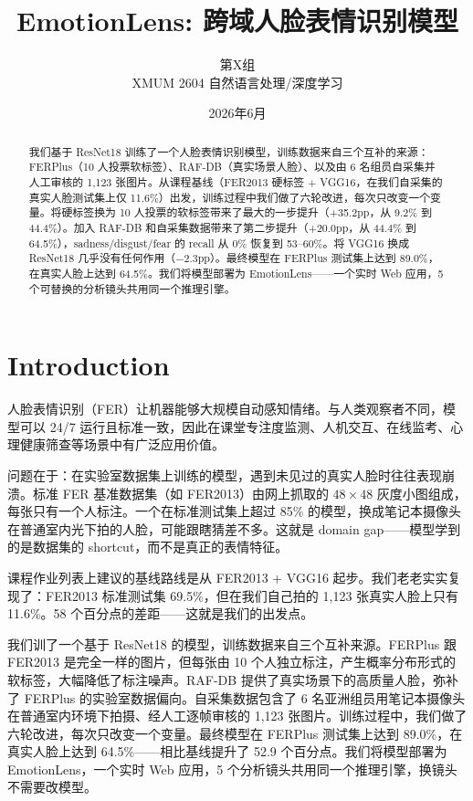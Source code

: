 \documentclass[12pt,a4paper]{ctexart}
\title{\textbf{EmotionLens: 跨域人脸表情识别模型}}
\author{第X组 \\ XMUM 2604 自然语言处理/深度学习}
\date{2026年6月}
\begin{document}
\maketitle

\begin{abstract}
我们基于 ResNet18 训练了一个人脸表情识别模型，训练数据来自三个互补的来源：FERPlus（10 人投票软标签）、RAF-DB（真实场景人脸）、以及由 6 名组员自采集并人工审核的 1,123 张图片。从课程基线（FER2013 硬标签 + VGG16，在我们自采集的真实人脸测试集上仅 11.6\%）出发，训练过程中我们做了六轮改进，每次只改变一个变量。将硬标签换为 10 人投票的软标签带来了最大的一步提升（+35.2pp，从 9.2\% 到 44.4\%）。加入 RAF-DB 和自采集数据带来了第二步提升（+20.0pp，从 44.4\% 到 64.5\%），sadness/disgust/fear 的 recall 从 0\% 恢复到 53--60\%。将 VGG16 换成 ResNet18 几乎没有任何作用（$-$2.3pp）。最终模型在 FERPlus 测试集上达到 89.0\%，在真实人脸上达到 64.5\%。我们将模型部署为 EmotionLens——一个实时 Web 应用，5 个可替换的分析镜头共用同一个推理引擎。
\end{abstract}

\tableofcontents
\newpage

\section{Introduction}

人脸表情识别（FER）让机器能够大规模自动感知情绪。与人类观察者不同，模型可以 24/7 运行且标准一致，因此在课堂专注度监测、人机交互、在线监考、心理健康筛查等场景中有广泛应用价值。

问题在于：在实验室数据集上训练的模型，遇到未见过的真实人脸时往往表现崩溃。标准 FER 基准数据集（如 FER2013）由网上抓取的 $48\times48$ 灰度小图组成，每张只有一个人标注。一个在标准测试集上超过 85\% 的模型，换成笔记本摄像头在普通室内光下拍的人脸，可能跟瞎猜差不多。这就是 domain gap——模型学到的是数据集的 shortcut，而不是真正的表情特征。

课程作业列表上建议的基线路线是从 FER2013 + VGG16 起步。我们老老实实复现了：FER2013 标准测试集 69.5\%，但在我们自己拍的 1,123 张真实人脸上只有 11.6\%。58 个百分点的差距——这就是我们的出发点。

我们训了一个基于 ResNet18 的模型，训练数据来自三个互补来源。FERPlus 跟 FER2013 是完全一样的图片，但每张由 10 个人独立标注，产生概率分布形式的软标签，大幅降低了标注噪声。RAF-DB 提供了真实场景下的高质量人脸，弥补了 FERPlus 的实验室数据偏向。自采集数据包含了 6 名亚洲组员用笔记本摄像头在普通室内环境下拍摄、经人工逐帧审核的 1,123 张图片。训练过程中，我们做了六轮改进，每次只改变一个变量。最终模型在 FERPlus 测试集上达到 89.0\%，在真实人脸上达到 64.5\%——相比基线提升了 52.9 个百分点。我们将模型部署为 EmotionLens，一个实时 Web 应用，5 个分析镜头共用同一个推理引擎，换镜头不需要改模型。
\end{document}
